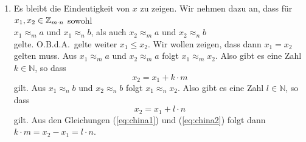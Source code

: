 \begin{enumerate}
      \\[0.2cm]
      \hspace*{1.3cm}
      $x = a \cdot n \cdot v + b \cdot m \cdot u - k \cdot (m \cdot n) \approx_m a$
      \\[0.2cm]
      haben.  Analog sehen wir, dass
      \\[0.2cm]
      \hspace*{1.3cm}
      $a \cdot n \cdot v - k \cdot (m \cdot n) \approx_n 0$
      \\[0.2cm]
      gilt.  Weiter folgt aus $m \cdot u \approx_n 1$, dass
      \\[0.2cm]
      \hspace*{1.3cm}
      $b \cdot m \cdot u \approx_m b$ 
      \\[0.2cm]
      gilt, so dass wir au\3erdem
      \\[0.2cm]
      \hspace*{1.3cm}
      $x = b \cdot m \cdot u + a \cdot n \cdot v - k \cdot (m \cdot n) \approx_n b$
      \\[0.2cm]
      haben. 
\item Es bleibt die Eindeutigkeit von $x$ zu zeigen.  Wir nehmen dazu an, dass f\"{u}r 
      $x_1, x_2\in \mathbb{Z}_{m \cdot n}$ sowohl
      \\[0.2cm]
      \hspace*{1.3cm}
      $x_1 \approx_m a$ und $x_1 \approx_n b$, \quad als auch \quad
      $x_2 \approx_m a$ und $x_2 \approx_n b$
      \\[0.2cm]
      gelte.  O.B.d.A.~gelte weiter $x_1 \leq x_2$.  Wir wollen zeigen, dass dann $x_1 = x_2$ gelten muss.
      Aus $x_1 \approx_m a$ und $x_2 \approx_m a$ folgt $x_1 \approx_m x_2$.  Also gibt es
      eine Zahl $k \in \mathbb{N}$, so 
      dass 
      \begin{equation}
        \label{eq:china1}
        x_2 = x_1 + k \cdot m  
      \end{equation}
      gilt.  Aus $x_1 \approx_n b$ und $x_2 \approx_n b$ folgt $x_1 \approx_n x_2$.  Also gibt es eine Zahl 
      $l \in \mathbb{N}$, so dass 
      \begin{equation}
        \label{eq:china2}
        x_2 = x_1 + l \cdot n  
      \end{equation}
      gilt.  Aus den Gleichungen  (\ref{eq:china1}) und (\ref{eq:china2}) folgt dann
      \\[0.2cm]
      \hspace*{1.3cm}
      $k \cdot m = x_2 - x_1 = l \cdot n$.
      \\[0.2cm]

\end{enumerate}
